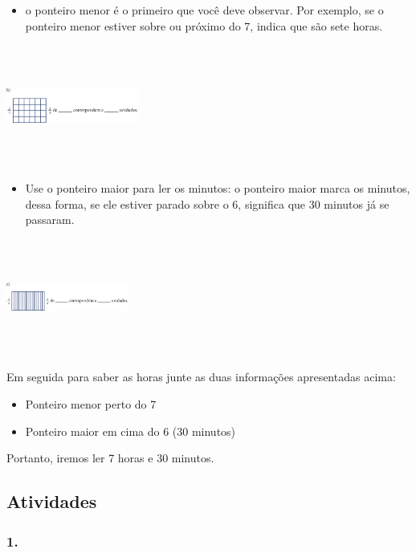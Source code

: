 \begin{itemize}
\item
  o ponteiro menor é o primeiro que você deve observar. Por exemplo, se
  o ponteiro menor estiver sobre ou próximo do 7, indica que são sete
  horas.
\end{itemize}

\includegraphics[width=1.69271in,height=1.56563in]{media/image59.png}

\begin{itemize}
\item
  Use o ponteiro maior para ler os minutos: o ponteiro maior marca os
  minutos, dessa forma, se ele estiver parado sobre o 6, significa que
  30 minutos já se passaram.
\end{itemize}

\includegraphics[width=1.57292in,height=1.50032in]{media/image60.png}

Em seguida para saber as horas junte as duas informações apresentadas
acima:

\begin{itemize}
\item
  Ponteiro menor perto do 7
\item
  Ponteiro maior em cima do 6 (30 minutos)
\end{itemize}

Portanto, iremos ler 7 horas e 30 minutos.

\subsection{Atividades}\label{atividades-4}

\subsubsection{1.}\label{section-52}

